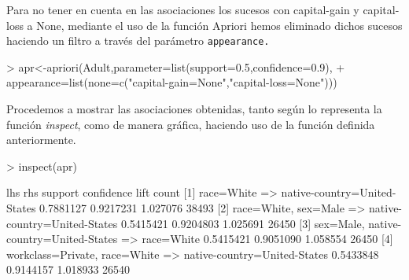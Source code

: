 \documentclass [a4paper] {article}
\begin{document}
{\bigskip
Para no tener en cuenta en las asociaciones los sucesos con capital-gain y capital-loss a None, 
mediante el uso de la función Apriori hemos eliminado dichos sucesos haciendo un filtro a través
del parámetro \texttt{appearance.}
\begin{Schunk}
\begin{Sinput}
> apr<-apriori(Adult,parameter=list(support=0.5,confidence=0.9),
+     appearance=list(none=c("capital-gain=None","capital-loss=None")))
\end{Sinput}
\end{Schunk}

\bigskip
Procedemos a mostrar las asociaciones obtenidas, tanto según lo representa la función \textit{inspect}, como 
de manera gráfica, haciendo uso de la función definida anteriormente.
\footnotesize
\begin{Schunk}
\begin{Sinput}
> inspect(apr)
\end{Sinput}
\begin{Soutput}
    lhs                               rhs                              support confidence     lift count
[1] {race=White}                   => {native-country=United-States} 0.7881127  0.9217231 1.027076 38493
[2] {race=White,                                                                                        
     sex=Male}                     => {native-country=United-States} 0.5415421  0.9204803 1.025691 26450
[3] {sex=Male,                                                                                          
     native-country=United-States} => {race=White}                   0.5415421  0.9051090 1.058554 26450
[4] {workclass=Private,                                                                                 
     race=White}                   => {native-country=United-States} 0.5433848  0.9144157 1.018933 26540
\end{Soutput}
\end{Schunk}

}
\end{document}
